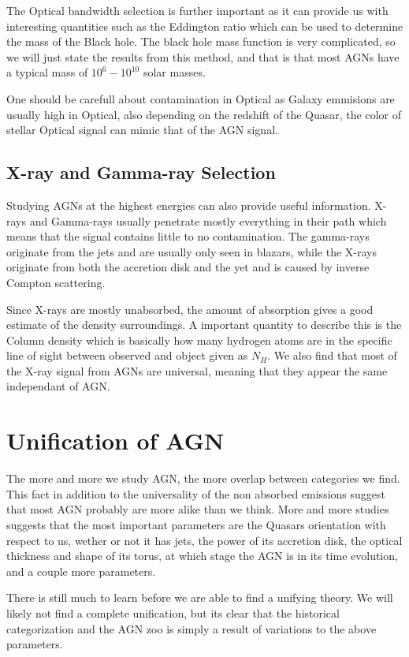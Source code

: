 \documentclass{article}
\begin{document}
The Optical bandwidth selection is further important as it can provide us with interesting quantities such as the Eddington ratio which can be used to determine the mass of the Black hole. The black hole mass function is very complicated, so we will just state the results from this method, and that is that most AGNs have a typical mass of $10^6 - 10^{10}$ solar masses.

One should be carefull about contamination in Optical as Galaxy emmisions are usually high in Optical, also depending on the redshift of the Quasar, the color of stellar Optical signal can mimic that of the AGN signal.

\subsection*{X-ray and Gamma-ray Selection}
Studying AGNs at the highest energies can also provide useful information. X-rays and Gamma-rays usually penetrate mostly everything in their path which means that the signal contains little to no contamination. The gamma-rays originate from the jets and are usually only seen in blazars, while the X-rays originate from both the accretion disk and the yet and is caused by inverse Compton scattering. 

Since X-rays are mostly unabsorbed, the amount of absorption gives a good estimate of the density surroundings. A important quantity to describe this is the Column density which is basically how many hydrogen atoms are in the specific line of sight between observed and object given as $N_H$. We also find that most of the X-ray signal from AGNs are universal, meaning that they appear the same independant of AGN.

\section*{Unification of AGN}
The more and more we study AGN, the more overlap between categories we find. This fact in addition to the universality of the non absorbed emissions suggest that most AGN probably are more alike than we think. More and more studies suggests that the most important parameters are the Quasars orientation with respect to us, wether or not it has jets, the power of its accretion disk, the optical thickness and shape of its torus, at which stage the AGN is in its time evolution, and a couple more parameters.

There is still much to learn before we are able to find a unifying theory. We will likely not find a complete unification, but its clear that the historical categorization and the AGN zoo is simply a result of variations to the above parameters.
\end{document}
